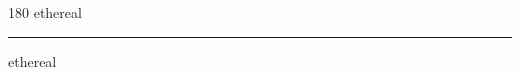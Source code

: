 
\begin{frame}
\begin{center}
\begin{turn}{180}
{\fontsize{2.5cm}{1em}\selectfont ethereal}
\end{turn}
\vspace{1em}\par  
\hrule
\vspace{1em}\par  
{\fontsize{2.5cm}{1em}\selectfont ethereal}
\end{center}
\end{frame}
